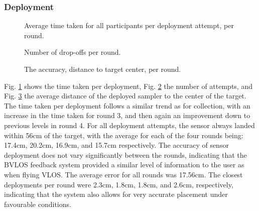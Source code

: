 
\subsubsection{Deployment}

\begin{figure}[!t]
\centering

\vspace{-0.6em}
\caption{Average time taken for all participants per deployment attempt, per round.}
\label{fig:fig5-deployment-time-boxplot}
\end{figure}

\begin{figure}[!t]
\centering

\vspace{-0.6em}
\caption{ Number of drop-offs per round.}
\label{fig:fig5-deployment-number-boxplot}
\end{figure}

\begin{figure}[!t]
\centering

\vspace{-0.6em}
\caption{The accuracy, distance to target center, per round.}
\label{fig:fig5-deployment-accuracy-boxplot}
\end{figure}

Fig. \ref{fig:fig5-deployment-time-boxplot} shows the time taken per deployment, Fig. \ref{fig:fig5-deployment-number-boxplot} the number of attempts, and Fig. \ref{fig:fig5-deployment-accuracy-boxplot} the average distance of the deployed sampler to the center of the target. The time taken per deployment follows a similar trend as for collection, with an increase in the time taken for round 3, and then again an improvement down to previous levels in round 4. For all deployment attempts, the sensor always landed within 56cm of the target, with the average for each of the four rounds being: 17.4cm, 20.2cm, 16.9cm, and 15.7cm respectively.
The accuracy of sensor deployment does not vary significantly between the rounds, indicating that the \gls{BVLOS} feedback system provided a similar level of information to the user as when flying \gls{VLOS}. The average error for all rounds was 17.56cm. The closest deployments per round were 2.3cm, 1.8cm, 1.8cm, and 2.6cm, respectively, indicating that the system also allows for very accurate placement under favourable conditions.

